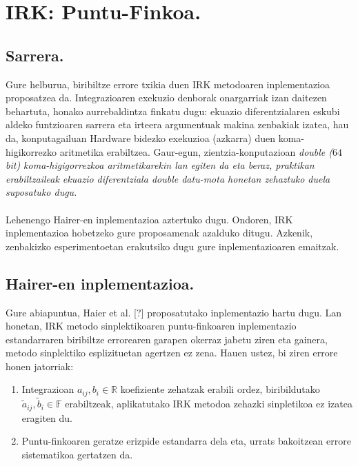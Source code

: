 \section{IRK: Puntu-Finkoa.}

\subsection{Sarrera.}

Gure helburua, biribiltze errore txikia duen IRK metodoaren inplementazioa proposatzea da. Integrazioaren exekuzio denborak onargarriak izan daitezen behartuta, honako aurrebaldintza finkatu dugu: ekuazio diferentzialaren eskubi aldeko funtzioaren 
sarrera eta irteera argumentuak makina zenbakiak izatea, hau da, konputagailuan Hardware bidezko exekuzioa (azkarra) duen koma-higikorrezko aritmetika erabiltzea. Gaur-egun, zientzia-konputazioan \it{double} ($64$ bit) koma-higigorrezkoa aritmetikarekin lan egiten da eta beraz, praktikan erabiltzaileak ekuazio diferentziala \it{double} datu-mota honetan zehaztuko duela suposatuko dugu.      

\paragraph*{} Lehenengo Hairer-en inplementazioa aztertuko dugu. Ondoren, IRK inplementazioa hobetzeko gure proposamenak azalduko ditugu. Azkenik, zenbakizko esperimentoetan erakutsiko dugu gure inplementazioaren emaitzak.

\subsection{Hairer-en inplementazioa.}

Gure abiapuntua, Haier et al. [?] proposatutako inplementazio hartu dugu.  
Lan honetan, IRK metodo sinplektikoaren puntu-finkoaren inplementazio estandarraren biribiltze errorearen garapen okerraz jabetu ziren eta gainera, metodo sinplektiko esplizituetan agertzen ez zena. Hauen ustez, bi ziren errore honen jatorriak:

\begin{enumerate}
\item Integrazioan $a_{ij}, b_i \in \mathbb{R}$ koefiziente zehatzak erabili ordez, biribildutako $\tilde a_{ij},\tilde b_i \in \mathbb{F}$ erabiltzeak, aplikatutako IRK metodoa zehazki sinpletikoa ez izatea eragiten du.
\item Puntu-finkoaren geratze erizpide estandarra dela eta, urrats bakoitzean errore sistematikoa gertatzen da.
\end{enumerate}    

